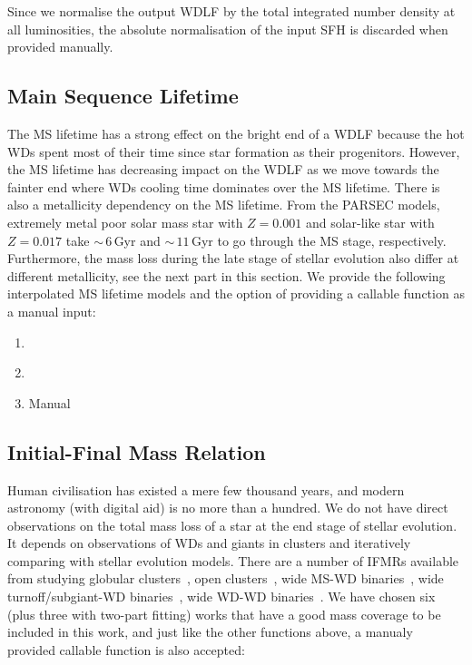 \documentclass[fleqn,usenatbib]{rasti}
\begin{document}
Since we normalise the output WDLF by the total integrated number density at
all luminosities, the absolute normalisation of the input SFH is discarded when
provided manually.

\subsection{Main Sequence Lifetime}
The MS lifetime has a strong effect on the bright end of a WDLF because the hot
WDs spent most of their time since star formation as their progenitors.
However, the MS lifetime has decreasing impact on the WDLF as we move towards
the fainter end where WDs cooling time dominates over the MS lifetime. There is
also a metallicity dependency on the MS lifetime. From the PARSEC
models\citep{2013EPJWC..4303001B}, extremely metal poor solar mass star with
$Z=0.001$ and solar-like star with $Z=0.017$ take $\sim$\,$6$\,Gyr and
$\sim$\,$11$\,Gyr to go through the MS stage, respectively. Furthermore,
the mass loss during the late stage of stellar evolution also differ at
different metallicity, see the next part in this section. We provide the
following interpolated MS lifetime models and the option of providing a
callable function as a manual input:

\begin{enumerate}
    \item \citet{2013EPJWC..4303001B}
    \item \citet{2016ApJ...823..102C}
    \item Manual
\end{enumerate}

\subsection{Initial-Final Mass Relation}
Human civilisation has existed a mere few thousand years, and modern astronomy
(with digital aid) is no more than a hundred. We do not have direct
observations on the total mass loss of a star at the end stage of stellar
evolution. It depends on observations of WDs and giants in clusters and
iteratively comparing with stellar evolution models. There are a number of
IFMRs available from studying globular clusters~\citep{2004A&A...420..515M,
2009ApJ...705..408K}, open clusters~\citep{2009ApJ...693..355W,
2016ApJ...818...84C}, wide MS-WD binaries~\citep{2008A&A...477..213C,
2012ApJ...746..144Z, 2018ApJ...860L..17E}, wide turnoff/subgiant-WD
binaries~\citep{2021ApJ...923..181B}, wide WD-WD
binaries~\citep{2015ASPC..493..325C, 2015ApJ...815...63A, 2018ApJ...866...21C}.
We have chosen six (plus three with two-part fitting) works that have a
good mass coverage to be included in this work, and just like the other
functions above, a manualy provided callable function is also accepted:
\end{document}
